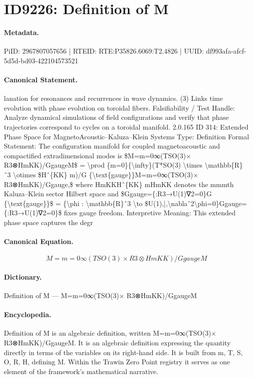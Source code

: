 \section*{ID9226: Definition of M}
\paragraph{Metadata.}
PiID: 2967807057656 | RTEID: RTE:P35826.6069:T2.4826 | UUID: df993afa-afcf-5d5d-bd03-422104573521

\paragraph{Canonical Statement.}
lanation for resonances and recurrences in wave dynamics. (3) Links time evolution with phase evolution on toroidal fibers. Falsifiability / Test Handle: Analyze dynamical simulations of field configurations and verify that phase trajectories correspond to cycles on a toroidal manifold. 2.0.165 ID 314: Extended Phase Space for MagnetoAcoustic–Kaluza–Klein Systems Type: Definition Formal Statement: The configuration manifold for coupled magnetoacoustic and compactified extradimensional modes is \$M=m=0∞(TSO(3)× R3⊗HmKK)/GgaugeM\$ = \textbackslash{}prod \{m=0\}\{\textbackslash{}infty\}(T*SO(3) \textbackslash{}times \textbackslash{}mathbb\{R\}ˆ3 \textbackslash{}otimes \$Hˆ\{KK\} m)/G \{\textbackslash{}text\{gauge\}\}M=m=0∞(TSO(3)× R3⊗HmKK)/Ggauge,\$ where HmKKHˆ\{KK\} mHmKK denotes the mmmth Kaluza–Klein sector Hilbert space and \$Ggauge=\{:R3→U(1)∇2=0\}G \{\textbackslash{}text\{gauge\}\}\$ = \{\textbackslash{}phi : \textbackslash{}mathbb\{R\}ˆ3 \textbackslash{}to \$U(1),|,\textbackslash{}nablaˆ2\textbackslash{}phi=0\}Ggauge=\{:R3→U(1)∇2=0\}\$ fixes gauge freedom. Interpretive Meaning: This extended phase space captures the degr

\paragraph{Canonical Equation.}
\[
M=m=0∞(TSO(3)× R3⊗HmKK)/GgaugeM
\]

\paragraph{Dictionary.}
Definition of M — M=m=0∞(TSO(3)× R3⊗HmKK)/GgaugeM

\paragraph{Encyclopedia.}
Definition of M is an algebraic definition, written M=m=0∞(TSO(3)× R3⊗HmKK)/GgaugeM. It is an algebraic definition expressing the quantity directly in terms of the variables on its right-hand side. It is built from m, T, S, O, R, H, defining M. Within the Trawin Zero Point registry it serves as one element of the framework's mathematical narrative.
